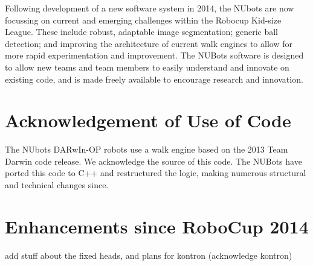 \documentclass{llncs}
\begin{document}
Following development of a new software system in 2014, the NUbots are now focussing on current and emerging challenges within the Robocup Kid-size League. These include robust, adaptable image segmentation; generic ball detection; and improving the architecture of current walk engines to allow for more rapid experimentation and improvement. The NUBots software is designed to allow new teams and team members to easily understand and innovate on existing code, and is made freely available to encourage research and innovation.





\section{Acknowledgement of Use of Code}
The NUbots DARwIn-OP robots use a walk engine based on the 2013 Team Darwin code release. We acknowledge the source of this code. The NUBots have ported this code to C++ and restructured the logic, making numerous structural and technical changes since. %

\section{Enhancements since RoboCup 2014}
\TODO add stuff about the fixed heads, and plans for kontron (acknowledge kontron)
\end{document}
